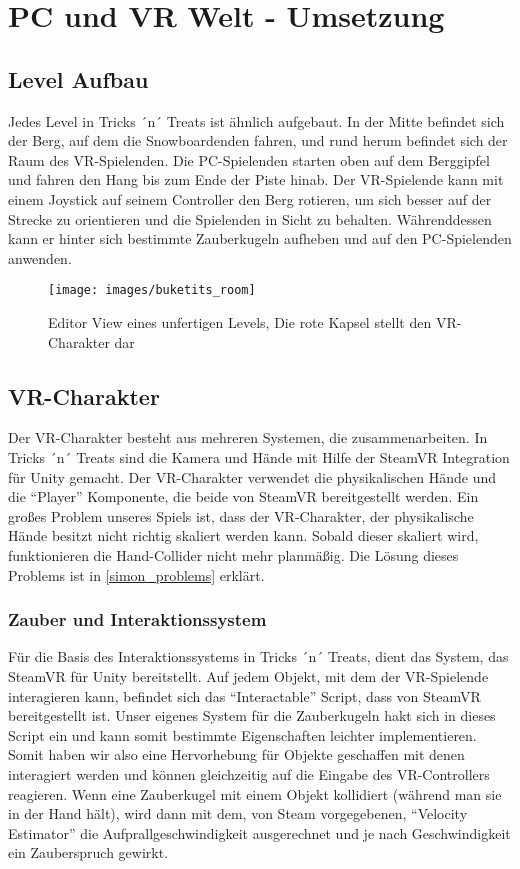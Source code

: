 \chapter{PC und VR Welt - Umsetzung}
\section{Level Aufbau}
Jedes Level in Tricks ´n´ Treats ist ähnlich aufgebaut. 
In der Mitte befindet sich der Berg, auf dem die Snowboardenden fahren, und rund herum befindet sich der Raum des VR-Spielenden. Die PC-Spielenden starten oben auf dem Berggipfel und fahren den Hang bis zum Ende der Piste hinab. Der VR-Spielende kann mit einem Joystick auf seinem Controller den Berg rotieren, um sich besser auf der Strecke zu orientieren und die Spielenden in Sicht zu behalten. Währenddessen kann er hinter sich bestimmte Zauberkugeln aufheben und auf den PC-Spielenden anwenden.


\begin{figure}[H]
	\centering
	\texttt{[image: images/buketits\_room]}
	\caption{Editor View eines unfertigen Levels, Die rote Kapsel stellt den VR-Charakter dar}
\end{figure}

\section{VR-Charakter} \label{simon_vrspieler}
Der VR-Charakter besteht aus mehreren Systemen, die zusammenarbeiten. In Tricks ´n´ Treats sind die Kamera und Hände mit Hilfe der SteamVR Integration für Unity gemacht. Der VR-Charakter verwendet die physikalischen Hände und die "`Player"' Komponente, die beide von SteamVR bereitgestellt werden. Ein großes Problem unseres Spiels ist, dass der VR-Charakter, der physikalische Hände besitzt nicht richtig skaliert werden kann. Sobald dieser skaliert wird, funktionieren die Hand-Collider nicht mehr planmäßig. Die Lösung dieses Problems ist in \ref{simon_problems} erklärt.

\subsection{Zauber und Interaktionssystem}
Für die Basis des Interaktionssystems in Tricks ´n´ Treats, dient das System, das SteamVR für Unity bereitstellt. Auf jedem Objekt, mit dem der VR-Spielende interagieren kann, befindet sich das "`Interactable"' Script, dass von SteamVR bereitgestellt ist. Unser eigenes System für die Zauberkugeln hakt sich in dieses Script ein und kann somit bestimmte Eigenschaften leichter implementieren. Somit haben wir also eine Hervorhebung für Objekte geschaffen mit denen interagiert werden und können gleichzeitig auf die Eingabe des VR-Controllers reagieren. Wenn eine Zauberkugel mit einem Objekt kollidiert (während man sie in der Hand hält), wird dann mit dem, von Steam vorgegebenen, "`Velocity Estimator"' die Aufprallgeschwindigkeit ausgerechnet und je nach Geschwindigkeit ein Zauberspruch gewirkt.

